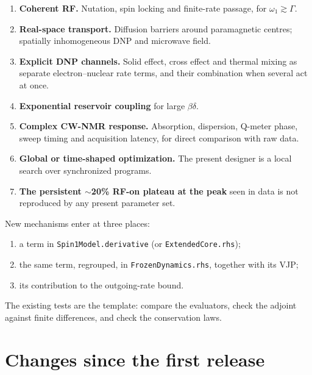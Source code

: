 \documentclass[11pt]{article}
\newcommand{\code}[1]{\texttt{#1}}
\begin{document}
\begin{enumerate}
  \item \textbf{Coherent RF.} Nutation, spin locking and finite-rate passage, for \(\omega_1\gtrsim\Gamma\).
  \item \textbf{Real-space transport.} Diffusion barriers around paramagnetic centres; spatially inhomogeneous DNP and microwave field.
  \item \textbf{Explicit DNP channels.} Solid effect, cross effect and thermal mixing as separate electron--nuclear rate terms, and their combination when several act at once.
  \item \textbf{Exponential reservoir coupling} for large \(\beta\delta\).
  \item \textbf{Complex CW-NMR response.} Absorption, dispersion, Q-meter phase, sweep timing and acquisition latency, for direct comparison with raw data.
  \item \textbf{Global or time-shaped optimization.} The present designer is a local search over synchronized programs.
  \item \textbf{The persistent \(\sim\)20\% RF-on plateau at the peak} seen in data is not reproduced by any present parameter set.
\end{enumerate}

New mechanisms enter at three places:
\begin{enumerate}
\item a term in \code{Spin1Model.derivative} (or \code{ExtendedCore.rhs});
\item the same term, regrouped, in \code{FrozenDynamics.rhs}, together with its VJP;
\item its contribution to the outgoing-rate bound.
\end{enumerate}
The existing tests are the template: compare the evaluators, check the adjoint against finite
differences, and check the conservation laws.

\section{Changes since the first release}
\label{sec:changes}
\end{document}
